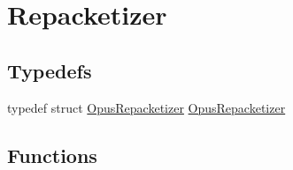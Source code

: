 \hypertarget{group__opus__repacketizer}{}\section{Repacketizer}
\label{group__opus__repacketizer}
\subsection*{Typedefs}
\begin{DoxyCompactItemize}
\item 
typedef struct \hyperlink{group__opus__repacketizer_ga1f85070a64bcbf5bf24f5ccb80323e7b}{Opus\+Repacketizer} \hyperlink{group__opus__repacketizer_ga1f85070a64bcbf5bf24f5ccb80323e7b}{Opus\+Repacketizer}
\end{DoxyCompactItemize}
\subsection*{Functions}

